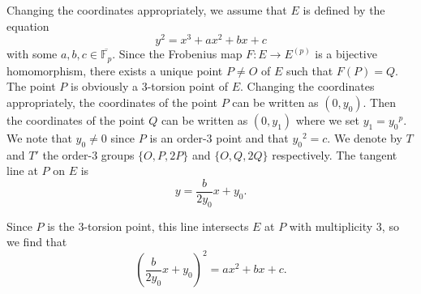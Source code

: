 \documentclass[a4paper, 11pt]{article}
\theoremstyle{plain}
\newcommand{\?}{\textcolor{red}{??}}
\newcommand{\fp}{\mathbb{F}_p}
\begin{document}
Changing the coordinates appropriately, we assume that $E$ is defined by the equation
\[
y^2=x^3+ax^2+bx+c
\]
with some $a,b,c \in \overline{\fp}$.  Since the Frobenius map $F:E \rightarrow E^{(p)}$ is a bijective homomorphism, there exists a unique point $P\ne O$ of $E$ such that $F(P)=Q$. The point $P$ is obviously a $3$-torsion point of $E$. Changing the coordinates appropriately, the coordinates of the point $P$ can be written as $(0,y_0)$. Then the coordinates of the point $Q$ can be written as $(0,y_1)$ where we set $y_1 ={y_0}^p$. We note that $y_0 \neq 0$ since $P$ is an order-$3$ point and that ${y_0}^2=c$. We denote by $T$ and $T'$ the order-$3$ groups $\{O,P,2P\} $ and $\{O,Q,2Q\} $ respectively. The tangent line at $P$ on $E$ is 
\[
y=\frac{b}{2y_0}x+y_0.
\]

Since $P$ is the $3$-torsion point, this line intersects $E$ at $P$ with multiplicity $3$, so we find that
\[ 
\left( \frac{b}{2y_0}x+y_0\right)^2 = ax^2+bx+c.
\]
\end{document}
